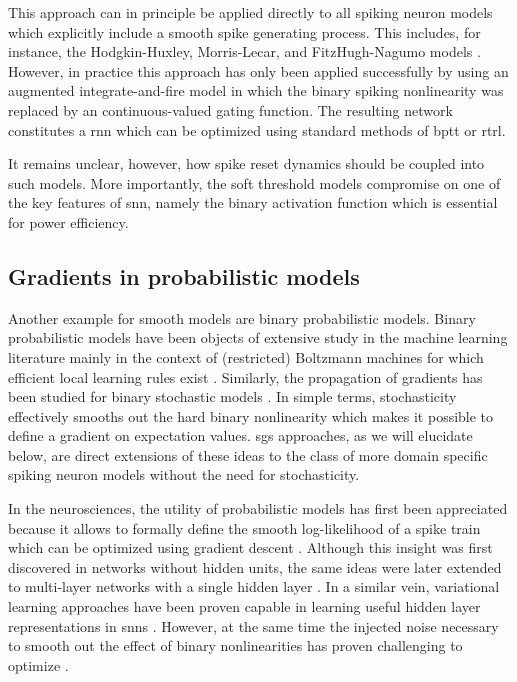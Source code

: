 \documentclass[journal,onecolumn,11pt]{IEEEtran}
\begin{document}
This approach can in principle be applied
directly to all spiking neuron models which explicitly include a smooth spike
generating process. This includes, for instance,  the Hodgkin-Huxley,
Morris-Lecar, and FitzHugh-Nagumo models \cite{Gerstner_etal14_neurdyna}.
However, in practice this approach has only been applied successfully by
\cite{Huh_Sejnowski17_graddesc} using an augmented integrate-and-fire model in
which the binary spiking nonlinearity was replaced by an continuous-valued
gating function.  The resulting network constitutes a \gls{rnn} which can be
optimized using standard methods of \gls{bptt} or \gls{rtrl}.  

It remains unclear, however, how spike reset dynamics should be coupled into
such models. More importantly, the soft threshold models compromise on one of
the key features of \gls{snn}, namely the binary activation function which is
essential for power efficiency.


\subsection{Gradients in probabilistic models}

Another example for smooth models are binary probabilistic models. 
Binary probabilistic models have been objects of extensive study in the machine
learning literature mainly in the context of (restricted) Boltzmann machines
for which efficient local learning rules exist \cite{ackley_learning_1985}. 
Similarly, the propagation of gradients has been studied for binary stochastic
models \cite{bengio_estimating_2013}. 
In simple terms, stochasticity effectively smooths out the hard binary
nonlinearity which makes it possible to define a gradient on expectation values.
\glspl{sg} approaches, as we will elucidate below, are direct extensions of
these ideas to the class of more domain specific spiking neuron models without
the need for stochasticity.  

In the neurosciences, the utility of probabilistic models 
has first been appreciated because it allows to formally define the smooth
log-likelihood of a spike train which can be optimized using gradient descent
\cite{pfister_optimal_2006}.
Although this insight was first discovered in networks without hidden units,
the same ideas were later extended to multi-layer networks with a single hidden
layer \cite{gardner_learning_2015}.
In a similar vein, variational learning approaches have been proven capable
in learning useful hidden layer representations in \glspl{snn}
\cite{brea_matching_2013, rezende_stochastic_2014,Mostafa_Cauwenberghs18}.
However, at the same time the injected noise necessary to smooth out the effect
of binary nonlinearities has proven challenging to optimize
\cite{rezende_stochastic_2014}.
\end{document}
